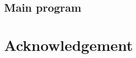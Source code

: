 \documentclass[11pt,twoside,a4paper]{report}
\begin{document}

\clearpage


\section{Main program}
\label{sec:mainprogram}



\clearpage


%
   


%
%
%
% 
%
%
%

\chapter*{Acknowledgement}\label{sec:ackn}

%
\normalsize
%
%
%
\end{document}
